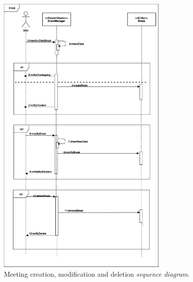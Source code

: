 \documentclass{article}
\begin{document}
	\newpage
	\begin{figure}[!ht]
	\centering
	\includegraphics[width=0.75\textwidth]{img/diagrams/sd_meeting.png}
	\caption{Meeting creation, modification and deletion \textit{sequence diagram}.}
	\end{figure}
\end{document}
